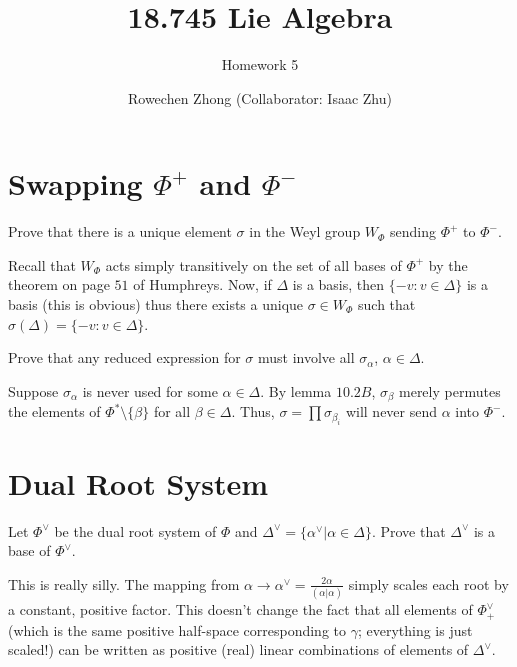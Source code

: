 \documentclass[11pt, headheight=30pt]{scrartcl}
\author{Rowechen Zhong (Collaborator: Isaac Zhu)}
\title{18.745 Lie Algebra}
\subtitle{Homework 5}
\begin{document}
\section{Swapping $\Phi^+$ and $\Phi^-$}
\begin{prob}
    Prove that there is a unique element $\sigma$ in the Weyl group $W_\Phi$ sending $\Phi^+$ to $\Phi^-$.
\end{prob}
Recall that $W_\Phi$ acts simply transitively on the set
of all bases of $\Phi^+$ by the theorem on page $51$ of Humphreys.
Now, if $\Delta$ is a basis,
then $\{-v: v\in \Delta\}$ is a basis (this is obvious)
thus there exists a unique $\sigma\in W_\Phi$ such that
$\sigma(\Delta) = \{-v: v\in \Delta\}$.



\begin{prob}
    Prove that any reduced expression for $\sigma$ must involve all $\sigma_\alpha$, $\alpha \in \Delta$.
\end{prob}
Suppose $\sigma_\alpha$ is never used for some $\alpha \in \Delta$.
By lemma $10.2B$, $\sigma_\beta$ merely permutes the elements
of $\Phi^* \setminus \{\beta\}$ for all $\beta \in \Delta$.
Thus, $\sigma = \prod \sigma_{\beta_i}$ will never send $\alpha$ into $\Phi^-$.

\section{Dual Root System}
\begin{prob}
    Let $\Phi^\vee$ be the dual root system of $\Phi$ and
    $\Delta^\vee = \{\alpha^\vee | \alpha \in \Delta\}$.
    Prove that $\Delta^\vee$ is a base of $\Phi^\vee$.
\end{prob}

This is really silly. The mapping from $\alpha\to \alpha^\vee = \frac{2\alpha}{(\alpha|\alpha)}$
simply scales each root by a constant, positive factor. This doesn't change
the fact that all elements of $\Phi^\vee_+$ (which is the same positive half-space
corresponding to $\gamma$; everything is just scaled!) can be written as
positive (real) linear combinations of elements of $\Delta^\vee$.
\end{document}
